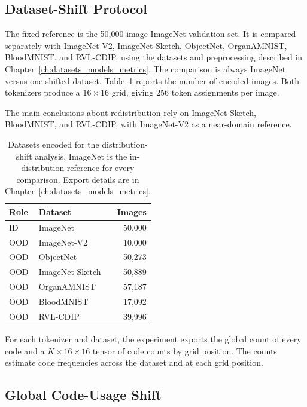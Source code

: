 \subsection{Dataset-Shift Protocol}
\label{subsec:rq5_dataset_protocol}

The fixed reference is the 50{,}000-image ImageNet validation set. It is
compared separately with ImageNet-V2, ImageNet-Sketch, ObjectNet, OrganAMNIST,
BloodMNIST, and RVL-CDIP, using the datasets and preprocessing described in
Chapter~\ref{ch:datasets_models_metrics}. The comparison is always ImageNet
versus one shifted dataset. Table~\ref{tab:rq5_dataset_sizes} reports the number of encoded images.
Both tokenizers produce a $16\times16$ grid, giving 256 token assignments per
image.

The main conclusions about redistribution rely on
ImageNet-Sketch, BloodMNIST, and RVL-CDIP, with ImageNet-V2 as a near-domain
reference.

\begin{table}[t]
    \centering
    \small
    \begin{tabular}{llr}
        \textbf{Role} & \textbf{Dataset} & \textbf{Images} \\ \hline
        ID & ImageNet & 50{,}000 \\ \hline
        OOD & ImageNet-V2 & 10{,}000 \\
        OOD & ObjectNet & 50{,}273 \\
        OOD & ImageNet-Sketch & 50{,}889 \\
        OOD & OrganAMNIST & 57{,}187 \\
        OOD & BloodMNIST & 17{,}092 \\
        OOD & RVL-CDIP & 39{,}996 \\
    \end{tabular}
    \caption{Datasets encoded for the distribution-shift analysis. ImageNet is
    the in-distribution reference for every comparison. Export details are in
    Chapter~\ref{ch:datasets_models_metrics}.}
    \label{tab:rq5_dataset_sizes}
\end{table}

For each tokenizer and dataset, the experiment exports the global count of
every code and a $K\times16\times16$ tensor of code counts by grid position.
The counts estimate code frequencies across the dataset and at each grid
position.

\subsection{Global Code-Usage Shift}
\label{subsec:rq5_global_metrics}

